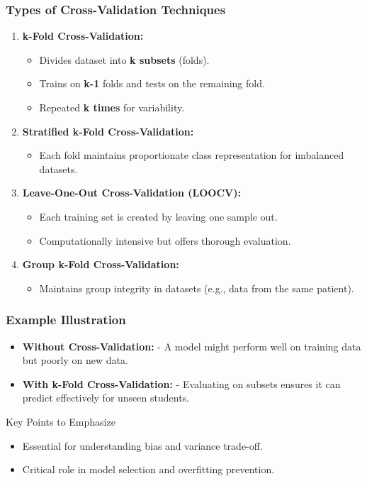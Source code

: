 \documentclass[aspectratio=169]{beamer}
\begin{document}
\begin{frame}[fragile]
    \frametitle{Types of Cross-Validation Techniques}
    \begin{enumerate}
        \item \textbf{k-Fold Cross-Validation:}
        \begin{itemize}
            \item Divides dataset into \textbf{k subsets} (folds).
            \item Trains on \textbf{k-1} folds and tests on the remaining fold.
            \item Repeated \textbf{k times} for variability.
        \end{itemize}
        
        \item \textbf{Stratified k-Fold Cross-Validation:}
        \begin{itemize}
            \item Each fold maintains proportionate class representation for imbalanced datasets.
        \end{itemize}
        
        \item \textbf{Leave-One-Out Cross-Validation (LOOCV):}
        \begin{itemize}
            \item Each training set is created by leaving one sample out.
            \item Computationally intensive but offers thorough evaluation.
        \end{itemize}
        
        \item \textbf{Group k-Fold Cross-Validation:}
        \begin{itemize}
            \item Maintains group integrity in datasets (e.g., data from the same patient).
        \end{itemize}
    \end{enumerate}
\end{frame}

\begin{frame}[fragile]
    \frametitle{Example Illustration}
    \begin{itemize}
        \item \textbf{Without Cross-Validation:} 
        - A model might perform well on training data but poorly on new data.
        \item \textbf{With k-Fold Cross-Validation:} 
        - Evaluating on subsets ensures it can predict effectively for unseen students.
    \end{itemize}
    \begin{block}{Key Points to Emphasize}
        \begin{itemize}
            \item Essential for understanding bias and variance trade-off.
            \item Critical role in model selection and overfitting prevention.
        \end{itemize}
    \end{block}
\end{frame}
\end{document}
